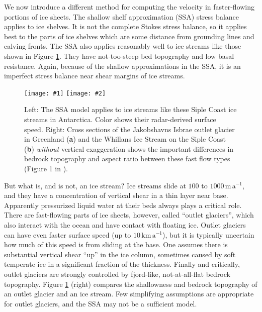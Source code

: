 \documentclass[titlepage,a4paper,final,12pt]{scrartcl}
\newcommand{\twofigsizes}[5]{
\begin{figure}[ht]
\centering
\texttt{[image: \#1]} \quad
\texttt{[image: \#2]}
\caption{#3}
\label{fig:#1}
\end{figure}}
\begin{document}
We now introduce a different method for computing the velocity in faster-flowing portions of ice sheets.  The shallow shelf approximation (SSA) stress balance applies to ice shelves.  It is not the complete Stokes stress balance, so it applies best to the parts of ice shelves which are some distance from grounding lines and calving fronts.  The SSA also applies reasonably well to ice streams like those shown in Figure \ref{fig:siple}.  They have not-too-steep bed topography and low basal resistance.  Again, because of the shallow approximations in the SSA, it is an imperfect stress balance near shear margins of ice streams.

\twofigsizes{siple}{streamisbrae}{Left:  The SSA model applies to ice streams like these Siple Coast ice streams in Antarctica.  Color shows their radar-derived surface speed.  Right: Cross sections of the Jakobshavns Isbrae outlet glacier in Greenland (\textbf{a}) and the Whillans Ice Stream on the Siple Coast (\textbf{b}) \emph{without} vertical exaggeration shows the important differences in bedrock topography and aspect ratio between these fast flow types (Figure 1 in \cite{TrufferEchelmeyer}).}{2.8in}{2.9in}

But what is, and is not, an ice stream?  Ice streams slide at $100$ to $1000 \,\text{m}\,\text{a}^{-1}$, and they have a concentration of vertical shear in a thin layer near base.  Apparently pressurized liquid water at their beds always plays a critical role.  There are fast-flowing parts of ice sheets, however, called ``outlet glaciers'', which also interact with the ocean and have contact with floating ice.  Outlet glaciers can have even faster surface speed (up to $10 \,\text{km}\,\text{a}^{-1}$), but it is typically uncertain how much of this speed is from sliding at the base.  One assumes there is substantial vertical shear ``up'' in the ice column, sometimes caused by soft temperate ice in a significant fraction of the thickness.  Finally and critically, outlet glaciers are strongly controlled by fjord-like, not-at-all-flat bedrock topography.  Figure \ref{fig:siple} (right) compares the shallowness and bedrock topography of an outlet glacier and an ice stream.  Few simplifying assumptions are appropriate for outlet glaciers, and the SSA may not be a sufficient model.
\end{document}
